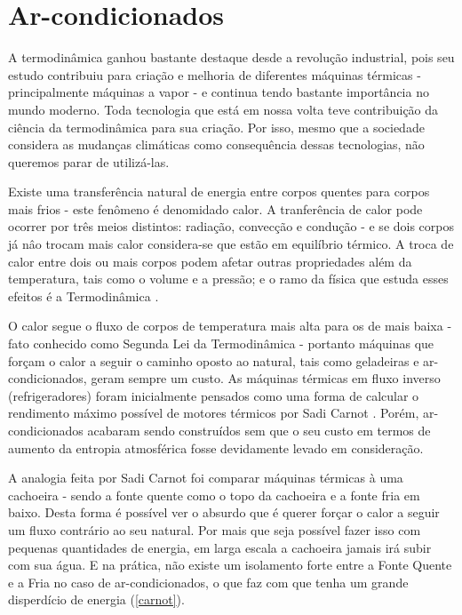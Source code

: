 \chapter[Ar-condicionados]{Ar-condicionados}

A termodinâmica ganhou bastante destaque desde a revolução industrial, pois seu estudo contribuiu para criação e melhoria de diferentes máquinas térmicas - principalmente máquinas a vapor - e continua tendo bastante importância no mundo moderno. Toda tecnologia que está em nossa volta teve contribuição da ciência da termodinâmica para sua criação. Por isso, mesmo que a sociedade considera as mudanças climáticas como consequência dessas tecnologias, não queremos parar de utilizá-las.

Existe uma transferência natural de energia entre corpos quentes para corpos mais frios - este fenômeno é denomidado calor. A tranferência de calor pode ocorrer por três meios distintos: radiação, convecção e condução - e se dois corpos já nâo trocam mais calor considera-se que estão em equilíbrio térmico. A troca de calor entre dois ou mais corpos podem afetar outras propriedades além da temperatura, tais como o volume e a pressão; e o ramo da física que estuda esses efeitos é a Termodinâmica \cite{Maxwell}.

O calor segue o fluxo de corpos de temperatura mais alta para os de mais baixa - fato conhecido como Segunda Lei da Termodinâmica - portanto máquinas que forçam o calor a seguir o caminho oposto ao natural, tais como geladeiras e ar-condicionados, geram sempre um custo. As máquinas térmicas em fluxo inverso (refrigeradores) foram inicialmente pensados como uma forma de calcular o rendimento máximo possível de motores térmicos por Sadi Carnot \cite{Carnot}. Porém, ar-condicionados acabaram sendo construídos sem que o seu custo em termos de aumento da entropia atmosférica fosse devidamente levado em consideração.

A analogia feita por Sadi Carnot foi comparar máquinas térmicas à uma cachoeira - sendo a fonte quente como o topo da cachoeira e a fonte fria em baixo. Desta forma é possível ver o absurdo que é querer forçar o calor a seguir um fluxo contrário ao seu natural. Por mais que seja possível fazer isso com pequenas quantidades de energia, em larga escala a cachoeira jamais irá subir com sua água. E na prática, não existe um isolamento forte entre a Fonte Quente e a Fria no caso de ar-condicionados, o que faz com que tenha um grande disperdício de energia (\autoref{carnot}).

